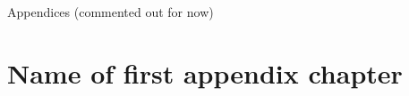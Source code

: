 \documentclass[letterpaper, 12pt, titlepage, openright, twoside, final]{book}
\begin{document}

\nocite{*}
\printbibliography[title={Bibliography}]


Appendices (commented out for now)

\ifprintversion%
    \cleardoublepage{}%
\else
    \thispagestyle{plain}
    \pagestyle{plain}
    \clearpage
\fi
%
\appendix
\appendixpage%


\chapter{Name of first appendix chapter\label{app:pimc_notes_chapter}}

% 


\clearpage%
\fi  %


\end{document}
